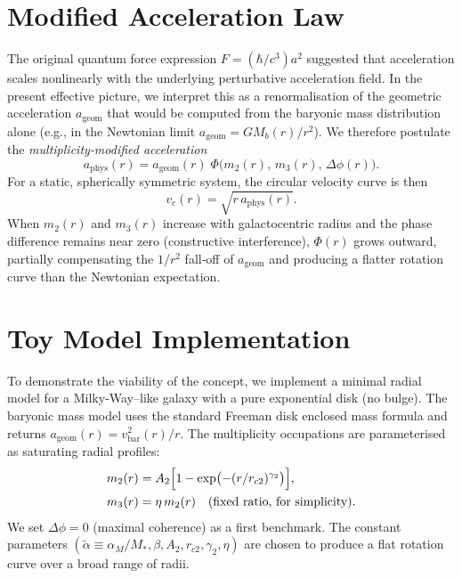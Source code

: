 \documentclass[11pt,a4paper]{article}
\theoremstyle{definition}
\theoremstyle{remark}
\begin{document}
\section{Modified Acceleration Law}
The original quantum force expression $F = (\hbar/c^3)a^2$ suggested that acceleration scales nonlinearly with the underlying perturbative acceleration field.
In the present effective picture, we interpret this as a renormalisation of the geometric acceleration $a_{\text{geom}}$ that would be computed from the baryonic mass distribution alone (e.g., in the Newtonian limit $a_{\text{geom}} = G M_b(r)/r^2$).
We therefore postulate the \textit{multiplicity‑modified acceleration}
\begin{equation}
a_{\text{phys}}(r) = a_{\text{geom}}(r)\;\Phi\bigl(m_2(r),\,m_3(r),\,\Delta\phi(r)\bigr).
\label{eq:acc}
\end{equation}
For a static, spherically symmetric system, the circular velocity curve is then
\begin{equation}
v_c(r) = \sqrt{r\,a_{\text{phys}}(r)}.
\label{eq:vc}
\end{equation}
When $m_2(r)$ and $m_3(r)$ increase with galactocentric radius and the phase difference remains near zero (constructive interference), $\Phi(r)$ grows outward, partially compensating the $1/r^2$ fall‑off of $a_{\text{geom}}$ and producing a flatter rotation curve than the Newtonian expectation.

\section{Toy Model Implementation}
To demonstrate the viability of the concept, we implement a minimal radial model for a Milky‑Way–like galaxy with a pure exponential disk (no bulge).
The baryonic mass model uses the standard Freeman disk enclosed mass formula and returns $a_{\text{geom}}(r) = v_{\text{bar}}^2(r)/r$.
The multiplicity occupations are parameterised as saturating radial profiles:
\begin{align}
m_2(r) &= A_2\Bigl[1 - \exp\bigl(-(r/r_{c2})^{\gamma_2}\bigr)\Bigr], \nonumber\\
m_3(r) &= \eta\,m_2(r) \quad \text{(fixed ratio, for simplicity)}.
\end{align}
We set $\Delta\phi=0$ (maximal coherence) as a first benchmark.
The constant parameters $(\tilde\alpha \equiv \alpha_M/M_*, \beta, A_2, r_{c2},\gamma_2,\eta)$ are chosen to produce a flat rotation curve over a broad range of radii.
\end{document}
